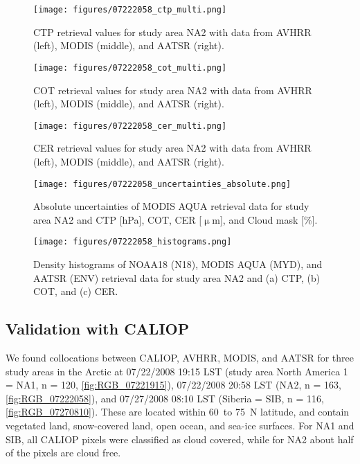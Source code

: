 \begin{figure*}[h]
  \texttt{[image: figures/07222058\_ctp\_multi.png]}
  \caption{CTP retrieval values for study area NA2 with data from AVHRR (left), MODIS (middle), and AATSR (right).}
  \label{fig:CTP_intercomparison}

  \texttt{[image: figures/07222058\_cot\_multi.png]}
  \caption{COT retrieval values for study area NA2 with data from AVHRR (left), MODIS (middle), and AATSR (right).}
  \label{fig:COT_intercomparison}

  \texttt{[image: figures/07222058\_cer\_multi.png]}
  \caption{CER retrieval values for study area NA2 with data from AVHRR (left), MODIS (middle), and AATSR (right).}
  \label{fig:CER_intercomparison}
\end{figure*}

\begin{figure*}[h]
  \texttt{[image: figures/07222058\_uncertainties\_absolute.png]} %
  \caption{Absolute uncertainties of MODIS AQUA retrieval data for study area NA2 and CTP [hPa], COT, CER [$\upmu$m], and Cloud mask [\%].} %
  \label{fig:uncertainties}
\end{figure*}

\begin{figure*}[h]
  \texttt{[image: figures/07222058\_histograms.png]}
  \caption{Density histograms of NOAA18 (N18), MODIS AQUA (MYD), and AATSR (ENV) retrieval data for study area NA2 and (a) CTP, (b) COT, and (c) CER.}
  \label{fig:histograms}
\end{figure*}

\subsection{Validation with CALIOP}

We found collocations between CALIOP, AVHRR, MODIS, and AATSR for three study areas in the Arctic at 07/22/2008 19:15 LST (study area North America 1 = NA1, n = 120, \cref{fig:RGB_07221915}), 07/22/2008 20:58 LST (NA2, n = 163, \cref{fig:RGB_07222058}), and 07/27/2008 08:10 LST (Siberia = SIB, n = 116, \cref{fig:RGB_07270810}). These are located within 60\textdegree\ to 75\textdegree\ N latitude, and contain vegetated land, snow-covered land, open ocean, and sea-ice surfaces. For NA1 and SIB, all CALIOP pixels were classified as cloud covered, while for NA2 about half of the pixels are cloud free.

